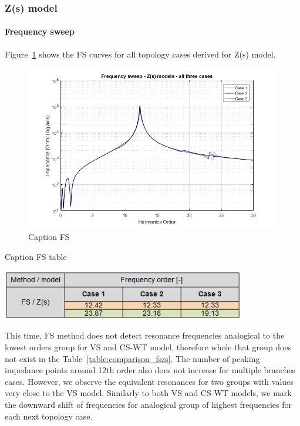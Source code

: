 \documentclass[12pt]{report} %
\begin{document}
\subsubsection{Z(s) model}
\paragraph{Frequency sweep}
Figure~\ref{fig:comparison_fszs} shows the FS curves for all topology cases derived for Z(s) model.

\begin{figure}[htb]
	\centering
	\includegraphics[width=1\textwidth]{img/Case123/FS_Zs_log.png}
	\caption{Caption FS}
  	\label{fig:comparison_fszs}
\end{figure}
\FloatBarrier

\begin{table}[htb]
	\centering
	\caption{Caption FS table}
	\includegraphics[width=0.8\textwidth]{img/Case123/FS_Zs_table.png}
  	\label{table:comparison_fszs}
\end{table}
\FloatBarrier

This time, FS method does not detect resonance frequencies analogical to the lowest orders group for VS and CS-WT model, therefore whole that group does not exist in the Table~\ref{table:comparison_fszs}. The number of peaking impedance points around 12th order also does not increase for multiple branches cases. However, we observe the equivalent resonances for two groups with values very close to the VS model. Similarly to both VS and CS-WT models, we mark the downward shift of frequencies for analogical group of highest frequencies for each next topology case.
\end{document}
